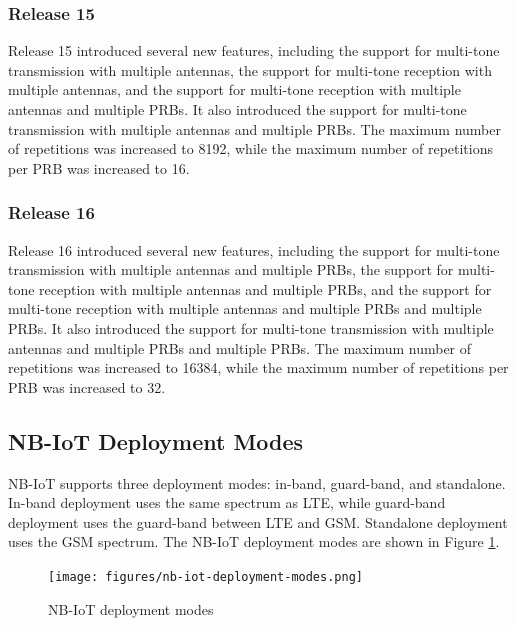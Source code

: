 \subsubsection{Release 15}
Release 15 introduced several new features, including the support for multi-tone transmission with multiple antennas, the support for multi-tone reception with multiple antennas, and the support for multi-tone reception with multiple antennas and multiple PRBs. It also introduced the support for multi-tone transmission with multiple antennas and multiple PRBs. The maximum number of repetitions was increased to 8192, while the maximum number of repetitions per PRB was increased to 16.

\subsubsection{Release 16}
Release 16 introduced several new features, including the support for multi-tone transmission with multiple antennas and multiple PRBs, the support for multi-tone reception with multiple antennas and multiple PRBs, and the support for multi-tone reception with multiple antennas and multiple PRBs and multiple PRBs. It also introduced the support for multi-tone transmission with multiple antennas and multiple PRBs and multiple PRBs. The maximum number of repetitions was increased to 16384, while the maximum number of repetitions per PRB was increased to 32.

\subsection{NB-IoT Deployment Modes}
NB-IoT supports three deployment modes: in-band, guard-band, and standalone. In-band deployment uses the same spectrum as LTE, while guard-band deployment uses the guard-band between LTE and GSM. Standalone deployment uses the GSM spectrum. The NB-IoT deployment modes are shown in Figure \ref{fig:nb-iot-deployment-modes}.
\begin{figure}[ht]
    \centering
    \texttt{[image: figures/nb-iot-deployment-modes.png]}
    \caption{NB-IoT deployment modes \cite{nb-iot-deployment-modes}}
    \label{fig:nb-iot-deployment-modes}
\end{figure}

